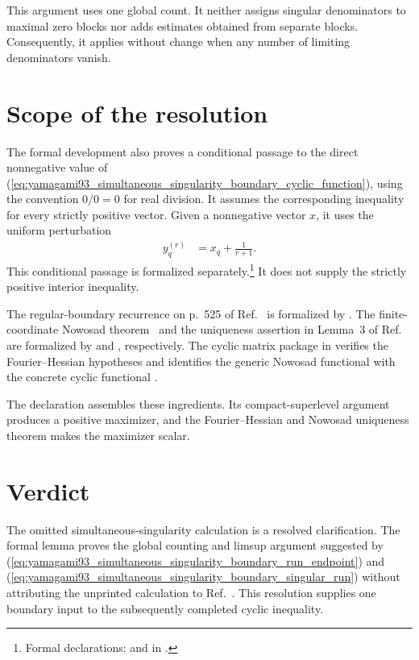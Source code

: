 \documentclass[11pt]{article}
\begin{document}
This argument uses one global count. It neither assigns singular denominators
to maximal zero blocks nor adds estimates obtained from separate blocks.
Consequently, it applies without change when any number of limiting
denominators vanish.

\section{Scope of the resolution}

The formal development also proves a conditional passage to the direct
nonnegative value of
(\ref{eq:yamagami93_simultaneous_singularity_boundary_cyclic_function}), using
the convention $0/0=0$ for real division. It assumes the corresponding
inequality for every strictly positive vector. Given a nonnegative vector
$x$, it uses the uniform perturbation
\begin{align}
    y_q^{(r)}
        &= x_q+\frac{1}{r+1}.
    \label{eq:yamagami93_simultaneous_singularity_boundary_uniform_perturbation}
\end{align}
This conditional passage is formalized separately.\footnote{Formal
declarations:
 and
 in
.}
It does not supply the strictly positive interior inequality.

The regular-boundary recurrence on p.~525 of
Ref.~\cite{Yamagami1993Cyclic} is formalized by
. The finite-coordinate
Nowosad theorem~\cite{Nowosad1968Isoperimetric} and the uniqueness assertion
in Lemma~3 of Ref.~\cite{Yamagami1993Cyclic} are formalized by
 and
, respectively. The cyclic
matrix package in  verifies the
Fourier--Hessian hypotheses and identifies the generic Nowosad functional with
the concrete cyclic functional .

The declaration  assembles these
ingredients. Its compact-superlevel argument produces a positive maximizer,
and the Fourier--Hessian and Nowosad uniqueness theorem makes the maximizer
scalar.

\section{Verdict}

The omitted simultaneous-singularity calculation is a resolved clarification.
The formal lemma proves the global counting and limsup argument suggested by
(\ref{eq:yamagami93_simultaneous_singularity_boundary_run_endpoint}) and
(\ref{eq:yamagami93_simultaneous_singularity_boundary_singular_run}) without
attributing the unprinted calculation to Ref.~\cite{Yamagami1993Cyclic}. This
resolution supplies one boundary input to the subsequently completed cyclic
inequality.



\end{document}
